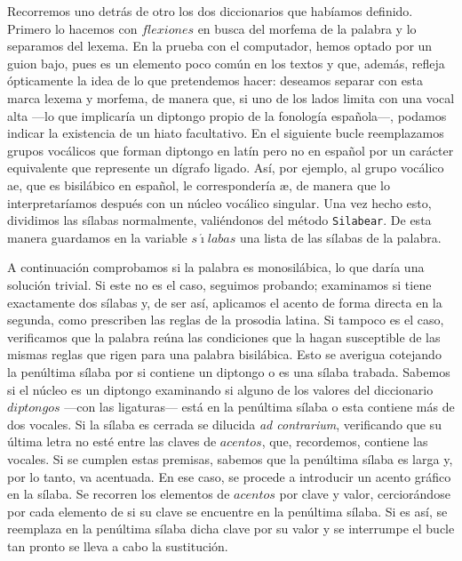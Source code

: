 Recorremos uno detrás de otro los dos diccionarios que habíamos definido. Primero lo hacemos con $flexiones$ en busca del morfema de la palabra y lo separamos del lexema. En la prueba con el computador, hemos optado por un guion bajo, pues es un elemento poco común en los textos y que, además, refleja ópticamente la idea de lo que pretendemos hacer: deseamos separar con esta marca lexema y morfema, de manera que, si uno de los lados limita con una vocal alta —lo que implicaría un diptongo propio de la fonología española—, podamos indicar la existencia de un hiato facultativo. En el siguiente bucle reemplazamos grupos vocálicos que forman diptongo en latín pero no en español por un carácter equivalente que represente un dígrafo ligado. Así, por ejemplo, al grupo vocálico \textlangle{}ae\textrangle{}, que es bisilábico en español, le correspondería \textlangle{}æ\textrangle{}, de manera que lo interpretaríamos después con un núcleo vocálico singular. Una vez hecho esto, dividimos las sílabas normalmente, valiéndonos del método \texttt{Silabear}. De esta manera guardamos en la variable $s\acute{\imath}labas$ una lista de las sílabas de la palabra.

A continuación comprobamos si la palabra es monosilábica, lo que daría una solución trivial. Si este no es el caso, seguimos probando; examinamos si tiene exactamente dos sílabas y, de ser así, aplicamos el acento de forma directa en la segunda, como prescriben las reglas de la prosodia latina. Si tampoco es el caso, verificamos que la palabra reúna las condiciones que la hagan susceptible de las mismas reglas que rigen para una palabra bisilábica. Esto se averigua cotejando la penúltima sílaba por si contiene un diptongo o es una sílaba trabada. Sabemos si el núcleo es un diptongo examinando si alguno de los valores del diccionario $diptongos$ —con las ligaturas— está en la penúltima sílaba o esta contiene más de dos vocales. Si la sílaba es cerrada se dilucida \textit{ad contrarium}, verificando que su última letra no esté entre las claves de $acentos$, que, recordemos, contiene las vocales. Si se cumplen estas premisas, sabemos que la penúltima sílaba es larga y, por lo tanto, va acentuada. En ese caso, se procede a introducir un acento gráfico en la sílaba. Se recorren los elementos de $acentos$ por clave y valor, cerciorándose por cada elemento de si su clave se encuentre en la penúltima sílaba. Si es así, se reemplaza en la penúltima sílaba dicha clave por su valor y se interrumpe el bucle tan pronto se lleva a cabo la sustitución.


